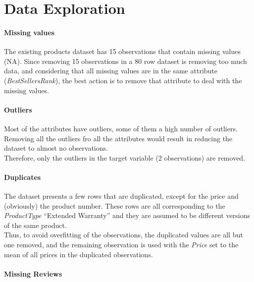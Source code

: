 \documentclass[]{article}
\let\oldparagraph\paragraph
\renewcommand{\paragraph}[1]{\oldparagraph{#1}\mbox{}}
\begin{document}
\hypertarget{data-exploration}{%
\section{Data Exploration}\label{data-exploration}}

\hypertarget{missing-values}{%
\paragraph{Missing values}\label{missing-values}}

The existing products dataset has 15 observations that contain missing
values (NA). Since removing 15 observations in a 80 row dataset is
removing too much data, and considering that all missing values are in
the same attribute (\emph{BestSellersRank}), the best action is to
remove that attribute to deal with the missing values.

\hypertarget{outliers}{%
\paragraph{Outliers}\label{outliers}}

Most of the attributes have outliers, some of them a high number of
outliers. Removing all the outliers fro all the attributes would result
in reducing the dataset to almost no observations.\\
Therefore, only the outliers in the target variable (2 observations) are
removed.

\hypertarget{duplicates}{%
\paragraph{Duplicates}\label{duplicates}}

The dataset presents a few rows that are duplicated, except for the
price and (obviously) the product number. These rows are all
corresponding to the \emph{ProductType} ``Extended Warranty'' and they
are assumed to be different versions of the same product.\\
Thus, to avoid overfitting of the observations, the duplicated values
are all but one removed, and the remaining observation is used with the
\emph{Price} set to the mean of all prices in the duplicated
observations.

\hypertarget{missing-reviews}{%
\paragraph{Missing Reviews}\label{missing-reviews}}
\end{document}
